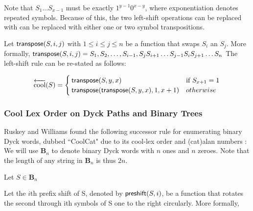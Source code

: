 Note that $S_1...S_{x-1}$ must be exactly $1^{y-1}0^{x-y}$, where exponentiation denotes repeated symbols.  Because of this, the two left-shift operations can be replaced with can be replaced with either one or two symbol transpositions.  

\noindent Let $\mathsf{transpose(} S, i, j \mathsf{)}$ with $1 \le i \le j \le n$ be a function that swaps $S_i$ an $S_j$.  More formally, $\mathsf{transpose(} S, i, j \mathsf{)}=S_1,S_2,\dots,S_{i-1},S_{j}S_{i+1}\dots S_{j-1}S_i S_{j+1}\dots S_n$
The left-shift rule can be re-stated as follows:

\begin{equation*}
    \overleftarrow{\text{cool}}(S) = \begin{cases}
	\mathsf{transpose(} S, y, x \mathsf{)} & \text{if $S_{x+1}=1$}\\
	\mathsf{transpose(} \mathsf{transpose(} S, y, x \mathsf{)}, 1, x+1 \mathsf{)} & otherwise\\
\end{cases}
\end{equation*}





\subsubsection{Cool Lex Order on Dyck Paths and Binary Trees}
Ruskey and Williams found the following successor rule for enumerating binary Dyck words, dubbed ``CoolCat" due to its cool-lex order and (cat)alan numbers \cite{ruskey2008generating}:
We will use $\mathbf{B}_n$ to denote binary Dyck words with $n$ ones and $n$ zeroes.  Note that the length of any string in $\mathbf{B}_n$ is thus $2n$.

\noindent Let $S \in \mathbf{B}_n$

\noindent Let the $i$th prefix shift of S, denoted by $\mathsf{preshift(} S, i \mathsf{)}$, be a function that rotates the second through ith symbols of S one to the right circularly.  More formally, 


